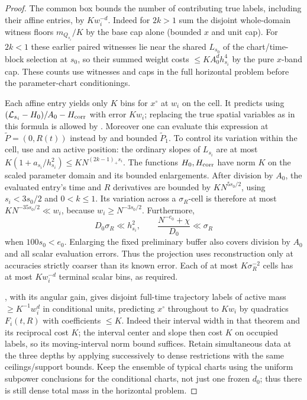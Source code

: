 \begin{proof}
The common box bounds the number of contributing true labels,
including their affine entries, by \(Kw_i^{-d}\). Indeed for \(2k>1\) sum the disjoint whole-domain witness floors \(m_{Q_{s_i}}/K\) by the base cap alone (bounded \(x\) and unit cap). For \(2k<1\) these earlier paired witnesses lie near the shared \(L_{s_0}\) of the chart/time-block selection at \(s_0\), so their summed weight costs \(\le K A_0^d h_{s_i}^4\) by the pure \(x\)-band cap. These counts use witnesses and caps in the full horizontal problem before the parameter-chart conditionings.

Each affine entry yields only \(K\) bins for \(x^\circ\) at \(w_i\) on the cell. It predicts using \(({\cal L}_{s_i}-H_0)/A_0-H_{\rm corr}\) with error \(K w_i\); replacing the true spatial variables as in this formula is allowed by . Moreover one can evaluate this expression at \(\widetilde P=(0,R(t))\) instead by  and bounded \(\widetilde P_1\). To control its variation within the cell, use
 and an active position: the ordinary
slopes of \(L_{s_i}\) are at most
\(K(1+a_{s_i}/h_{s_i}^2)\le KN^{(2k-1)_+s_i}\).
The functions \(H_0,H_{\rm corr}\) have norm \(K\) on the
scaled parameter domain and its bounded enlargements.  After division
by \(A_0\), the evaluated entry's time and \(R\) derivatives
are bounded by \(KN^{5s_0/2}\), using \(s_i<3s_0/2\) and
\(0<k\le1\).  Its variation across a \(\sigma_R\)-cell is
therefore at most \(KN^{-35s_0/2}\ll w_i\), because
\(w_i\ge N^{-3s_0/2}\).  Furthermore,
\[
 D_0\sigma_R\ll h_{s_i}^2,\qquad
 \frac{N^{-e_0}+\chi}{D_0}\ll\sigma_R
\]
when \(100s_0<e_0\).  Enlarging the fixed preliminary buffer also
covers division by \(A_0\) and all scalar evaluation errors.
Thus the projection uses reconstruction only at accuracies
strictly coarser than its known error. Each of at most
\(K\sigma_R^{-2}\) cells has at most \(Kw_i^{-d}\) terminal
scalar bins, as required.

, with its angular gain, gives disjoint full-time trajectory labels of active mass \(\ge K^{-1}w_i^d\) in conditional units, predicting \(x^\circ\) throughout to \(K w_i\) by quadratics \(F_i(t,R)\) with coefficients \(\le K\). Indeed their interval width in that theorem and its reciprocal cost \(K\); the interval center and slope then cost \(K\) on occupied labels, so its moving-interval norm bound suffices. Retain simultaneous data at the three depths by applying successively to dense restrictions with the same ceilings/support bounds. Keep the ensemble of typical charts using the uniform subpower conclusions for the conditional charts, not just one frozen \(d_0\); thus there is still dense total mass in the horizontal problem.


\end{proof}
